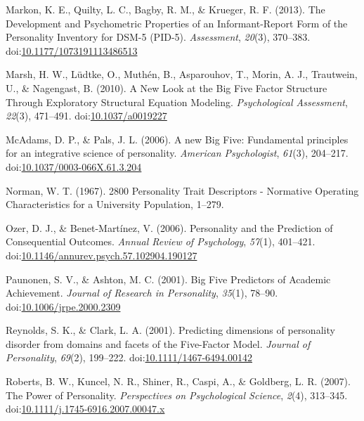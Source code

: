 \documentclass[man]{apa6}
\theoremstyle{definition}
\theoremstyle{definition}
\theoremstyle{definition}
\theoremstyle{remark}
\begin{document}
\leavevmode\hypertarget{ref-Markon2013}{}%
Markon, K. E., Quilty, L. C., Bagby, R. M., \& Krueger, R. F. (2013).
The Development and Psychometric Properties of an Informant-Report Form
of the Personality Inventory for DSM-5 (PID-5). \emph{Assessment},
\emph{20}(3), 370--383.
doi:\href{https://doi.org/10.1177/1073191113486513}{10.1177/1073191113486513}

\leavevmode\hypertarget{ref-Marsh2010}{}%
Marsh, H. W., Lüdtke, O., Muthén, B., Asparouhov, T., Morin, A. J.,
Trautwein, U., \& Nagengast, B. (2010). A New Look at the Big Five
Factor Structure Through Exploratory Structural Equation Modeling.
\emph{Psychological Assessment}, \emph{22}(3), 471--491.
doi:\href{https://doi.org/10.1037/a0019227}{10.1037/a0019227}

\leavevmode\hypertarget{ref-McAdams2006a}{}%
McAdams, D. P., \& Pals, J. L. (2006). A new Big Five: Fundamental
principles for an integrative science of personality. \emph{American
Psychologist}, \emph{61}(3), 204--217.
doi:\href{https://doi.org/10.1037/0003-066X.61.3.204}{10.1037/0003-066X.61.3.204}

\leavevmode\hypertarget{ref-Norman1967}{}%
Norman, W. T. (1967). 2800 Personality Trait Descriptors - Normative
Operating Characteristics for a University Population, 1--279.

\leavevmode\hypertarget{ref-OzerBenet2006}{}%
Ozer, D. J., \& Benet-Martínez, V. (2006). Personality and the
Prediction of Consequential Outcomes. \emph{Annual Review of
Psychology}, \emph{57}(1), 401--421.
doi:\href{https://doi.org/10.1146/annurev.psych.57.102904.190127}{10.1146/annurev.psych.57.102904.190127}

\leavevmode\hypertarget{ref-Paunonen2001}{}%
Paunonen, S. V., \& Ashton, M. C. (2001). Big Five Predictors of
Academic Achievement. \emph{Journal of Research in Personality},
\emph{35}(1), 78--90.
doi:\href{https://doi.org/10.1006/jrpe.2000.2309}{10.1006/jrpe.2000.2309}

\leavevmode\hypertarget{ref-ClarkReynolds2001}{}%
Reynolds, S. K., \& Clark, L. A. (2001). Predicting dimensions of
personality disorder from domains and facets of the Five-Factor Model.
\emph{Journal of Personality}, \emph{69}(2), 199--222.
doi:\href{https://doi.org/10.1111/1467-6494.00142}{10.1111/1467-6494.00142}

\leavevmode\hypertarget{ref-Roberts2007a}{}%
Roberts, B. W., Kuncel, N. R., Shiner, R., Caspi, A., \& Goldberg, L. R.
(2007). The Power of Personality. \emph{Perspectives on Psychological
Science}, \emph{2}(4), 313--345.
doi:\href{https://doi.org/10.1111/j.1745-6916.2007.00047.x}{10.1111/j.1745-6916.2007.00047.x}
\end{document}
